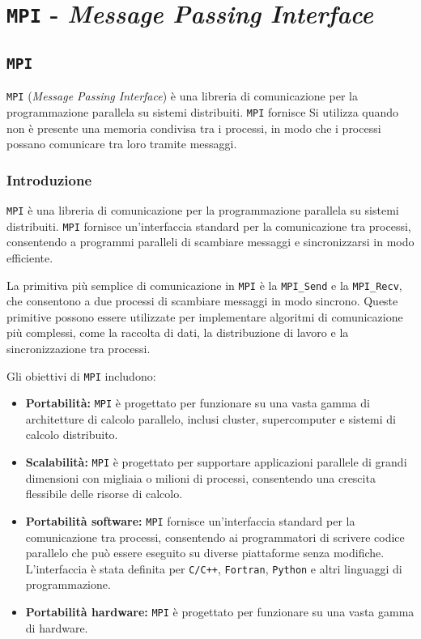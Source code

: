 \chapter{\texttt{MPI} - \textit{Message Passing Interface}}
\section{\texttt{MPI}}
\texttt{MPI} (\textit{Message Passing Interface}) è una libreria di comunicazione
per la programmazione parallela su sistemi distribuiti. \texttt{MPI} fornisce
Si utilizza quando non è presente una memoria condivisa tra i processi, 
in modo che i processi possano comunicare tra loro tramite messaggi.

\subsection{Introduzione}
\texttt{MPI} è una libreria di comunicazione per la programmazione parallela
su sistemi distribuiti. \texttt{MPI} fornisce un'interfaccia standard per la
comunicazione tra processi, consentendo a programmi paralleli di scambiare
messaggi e sincronizzarsi in modo efficiente.

La primitiva più semplice di comunicazione in \texttt{MPI} è la \texttt{MPI\_Send}
e la \texttt{MPI\_Recv}, che consentono a due processi di scambiare messaggi
in modo sincrono. Queste primitive possono essere utilizzate per implementare
algoritmi di comunicazione più complessi, come la raccolta di dati, la distribuzione
di lavoro e la sincronizzazione tra processi.

Gli obiettivi di \texttt{MPI} includono:
\begin{itemize}
  \item \textbf{Portabilità:} \texttt{MPI} è progettato per funzionare su una
  vasta gamma di architetture di calcolo parallelo, inclusi cluster, supercomputer
  e sistemi di calcolo distribuito.
  \item \textbf{Scalabilità:} \texttt{MPI} è progettato per supportare applicazioni
  parallele di grandi dimensioni con migliaia o milioni di processi, consentendo
  una crescita flessibile delle risorse di calcolo.
  \item \textbf{Portabilità software:} \texttt{MPI} fornisce un'interfaccia standard
  per la comunicazione tra processi, consentendo ai programmatori di scrivere
  codice parallelo che può essere eseguito su diverse piattaforme senza modifiche.
  L'interfaccia è stata definita per \texttt{C/C++}, \texttt{Fortran}, \texttt{Python}
  e altri linguaggi di programmazione.
  \item \textbf{Portabilità hardware:} \texttt{MPI} è progettato per funzionare su
  una vasta gamma di hardware.
\end{itemize}
